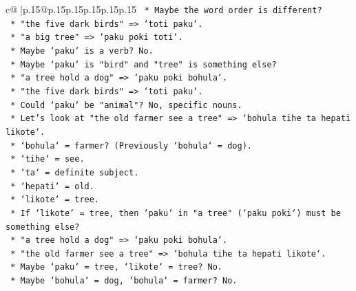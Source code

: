 \documentclass{article}
\begin{document}
{\begin{supertabular}{c@{$\;$}|p{.15\linewidth}@{}p{.15\linewidth}p{.15\linewidth}p{.15\linewidth}p{.15\linewidth}p{.15\linewidth}}
{{{\texttt{                                            *   Maybe the word order is different?} \\
\texttt{                                            *   "the five dark birds" => `toti paku`.} \\
\texttt{                                            *   "a big tree" => `paku poki toti`.} \\
\texttt{                                            *   Maybe `paku` is a verb? No.} \\
\texttt{                                            *   Maybe `paku` is "bird" and "tree" is something else?} \\
\texttt{                                            *   "a tree hold a dog" => `paku poki bohula`.} \\
\texttt{                                            *   "the five dark birds" => `toti paku`.} \\
\texttt{                                            *   Could `paku` be "animal"? No, specific nouns.} \\
\texttt{                                            *   Let's look at "the old farmer see a tree" => `bohula tihe ta hepati likote`.} \\
\texttt{                                                *   `bohula` = farmer? (Previously `bohula` = dog).} \\
\texttt{                                                *   `tihe` = see.} \\
\texttt{                                                *   `ta` = definite subject.} \\
\texttt{                                                *   `hepati` = old.} \\
\texttt{                                                *   `likote` = tree.} \\
\texttt{                                            *   If `likote` = tree, then `paku` in "a tree" (`paku poki`) must be something else?} \\
\texttt{                                            *   "a tree hold a dog" => `paku poki bohula`.} \\
\texttt{                                            *   "the old farmer see a tree" => `bohula tihe ta hepati likote`.} \\
\texttt{                                            *   Maybe `paku` = tree, `likote` = tree? No.} \\
\texttt{                                            *   Maybe `bohula` = dog, `bohula` = farmer? No.} \\
}}}
\end{supertabular}}
\end{document}
